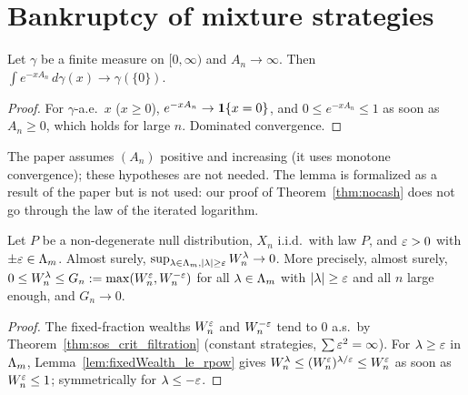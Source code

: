 \chapter{Bankruptcy of mixture strategies}
\label{chap:mixture}

\begin{lemma}[Lemma B.2]
  \label{lem:exp_regular}
  \leanok
  Let $\gamma$ be a finite measure on $[0, \infty)$ and $A_n \to \infty$. Then
  $\int e^{-x A_n} \, d\gamma(x) \to \gamma(\{0\})$.
\end{lemma}

\begin{proof}
  \leanok
  For $\gamma$-a.e.\ $x$ ($x \ge 0$), $e^{-x A_n} \to \mathbf{1}\{x = 0\}$, and $0 \le e^{-xA_n} \le 1$
  as soon as $A_n \ge 0$, which holds for large $n$. Dominated convergence.
\end{proof}

\begin{remark}
  The paper assumes $(A_n)$ positive and increasing (it uses monotone convergence); these
  hypotheses are not needed. The lemma is formalized as a result of the paper but is not used:
  our proof of Theorem~\ref{thm:nocash} does not go through the law of the iterated logarithm.
\end{remark}

\begin{lemma}
  \label{lem:mixture_large}
  \leanok
  Let $P$ be a non-degenerate null distribution, $X_n$ i.i.d.\ with law $P$, and $\varepsilon > 0$ with
  $\pm\varepsilon \in \Lambda_m$. Almost surely, $\sup_{\lambda \in \Lambda_m, \lvert \lambda \rvert \ge \varepsilon} W^\lambda_n \to 0$.
  More precisely, almost surely, $0 \le W^\lambda_n \le G_n := \max(W^\varepsilon_n, W^{-\varepsilon}_n)$ for all
  $\lambda \in \Lambda_m$ with $\lvert \lambda \rvert \ge \varepsilon$ and all $n$ large enough, and $G_n \to 0$.
\end{lemma}

\begin{proof}
  \leanok
  The fixed-fraction wealths $W^{\varepsilon}_n$ and $W^{-\varepsilon}_n$ tend to $0$ a.s.\ by
  Theorem~\ref{thm:sos_crit_filtration} (constant strategies, $\sum \varepsilon^2 = \infty$). For
  $\lambda \ge \varepsilon$ in $\Lambda_m$, Lemma~\ref{lem:fixedWealth_le_rpow} gives
  $W^\lambda_n \le (W^\varepsilon_n)^{\lambda/\varepsilon} \le W^\varepsilon_n$ as soon as $W^\varepsilon_n \le 1$; symmetrically
  for $\lambda \le -\varepsilon$.
\end{proof}

